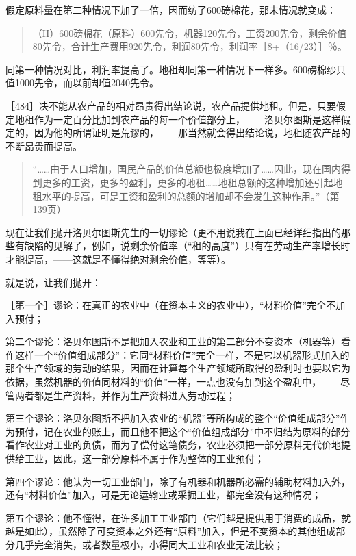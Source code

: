 假定原料量在第二种情况下加了一倍，因而纺了600磅棉花，那末情况就变成：

\begin{quote}{（II）600磅棉花（原料）600先令，机器120先令，工资200先令，剩余价值80先令，合计生产费用920先令，利润80先令，利润率［8+（16/23）］％。}\end{quote}

同第一种情况对比，利润率提高了。地租却同第一种情况下一样多。600磅棉纱只值1000先令，而以前却值2040先令。

［484］决不能从农产品的相对昂贵得出结论说，农产品提供地租。但是，只要假定地租作为一定百分比加到农产品的每一个价值部分上，——洛贝尔图斯是这样假定的，因为他的所谓证明是荒谬的，——那当然就会得出结论说，地租随农产品的不断昂贵而提高。

\begin{quote}{“……由于人口增加，国民产品的价值总额也极度增加了……因此，现在国内得到更多的工资，更多的盈利，更多的地租……地租总额的这种增加还引起地租水平的提高，可是工资和盈利的总额的增加却不会发生这种作用。”（第139页）}\end{quote}


现在让我们抛开洛贝尔图斯先生的一切谬论（更不用说我在上面已经详细指出的那些有缺陷的见解了，例如，说剩余价值率（“租的高度”）只有在劳动生产率增长时才能提高，——这就是不懂得绝对剩余价值，等等）。

就是说，让我们抛开：

［第一个］谬论：在真正的农业中（在资本主义的农业中），“材料价值”完全不加入预付；

第二个谬论：洛贝尔图斯不是把加入农业和工业的第二部分不变资本（机器等）看作这样一个“价值组成部分”：它同“材料价值”完全一样，不是它以机器形式加入的那个生产领域的劳动的结果，因而在计算每个生产领域所取得的盈利时也要以它为依据，虽然机器的价值同材料的“价值”一样，一点也没有加到这个盈利中，——尽管两者都是生产资料，并作为生产资料进入劳动过程；

第三个谬论：洛贝尔图斯不把加入农业的“机器”等所构成的整个“价值组成部分”作为预付，记在农业的账上，而且他不把这个“价值组成部分”中不归结为原料的部分看作农业对工业的负债，而为了偿付这笔债务，农业必须把一部分原料无代价地提供给工业，因此，这一部分原料不属于作为整体的工业预付；

第四个谬论：他认为一切工业部门，除了有机器和机器所必需的辅助材料加入外，还有“材料价值”加入，可是无论运输业或采掘工业，都完全没有这种情况；

第五个谬论：他不懂得，在许多加工工业部门（它们越是提供用于消费的成品，就越是如此），虽然除了可变资本之外还有“原料”加入，但是不变资本的其他组成部分几乎完全消失，或者数量极小，小得同大工业和农业无法比较；

